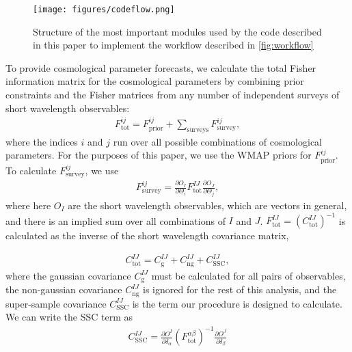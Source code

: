 \documentclass[a4paper,11pt]{article}
\begin{document}
\begin{figure}[!ht]
 \centering
\texttt{[image: figures/codeflow.png]}
  \caption{Structure of the most important modules used by the code described in this paper to implement the workflow described in \ref{fig:workflow} }
\label{fig:codeflow}
\end{figure}
To provide cosmological parameter forecasts, we calculate the total Fisher information matrix for the cosmological parameters by combining prior constraints and the Fisher matrices from any number of independent surveys of short wavelength observables:
\begin{align}\label{fisher_param}
F^{ij}_{\text{tot}}=F^{ij}_{\text{prior}}+\sum_{\text{surveys}}{F^{ij}_{\text{survey}}},
\end{align}
where the indices $i$ and $j$ run over all possible combinations of cosmological parameters. For the purposes of this paper, we use the WMAP priors\cite{jdem_fom} for $F^{ij}_{\text{prior}}$. To calculate  $F^{ij}_{\text{survey}}$, we use
\begin{align}\label{fisher_survey}
F^{ij}_{\text{survey}}=\frac{\partial O_I}{\partial \Theta_i} F^{IJ}_{\text{tot}}\frac{\partial O_J}{\partial \Theta_j},
\end{align}
where here $O_I$ are the short wavelength observables, which are vectors in general, and there is an implied sum over all combinations of $I$ and $J$. $F^{IJ}_{\text{tot}}=\left(C^{IJ}_{\text{tot}}\right)^{-1}$ is calculated as the inverse of the short wavelength covariance matrix, 

\begin{align}\label{cov_sw_tot}
C^{IJ}_{\text{tot}}=C^{IJ}_{\text{g}}+C^{IJ}_{\text{ng}}+C^{IJ}_{\text{SSC}},
\end{align}
where the gaussian covariance $C^{IJ}_{\text{g}}$ must be calculated for all pairs of observables, the non-gaussian covariance $C^{IJ}_{\text{ng}}$ is ignored for the rest of this analysis, and the super-sample covariance $C^{IJ}_{\text{SSC}}$ is the term our procedure is designed to calculate. We can write the SSC term as 
\begin{align}\label{cov_ssc}
C^{IJ}_{\text{SSC}} = \frac{\partial O^I}{\partial \delta_\alpha} (F^{\alpha\beta}_{\text{tot}})^{-1}\frac{\partial O^J}{\partial \delta_\beta} 
\end{align}
\end{document}
